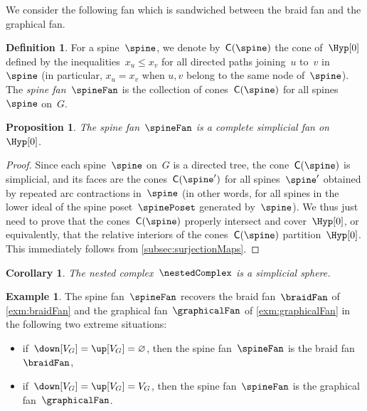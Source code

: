 \documentclass{amsart}
\newtheorem{corollary}[theorem]{Corollary}
\newtheorem{proposition}[theorem]{Proposition}
\theoremstyle{definition}
\newtheorem{definition}[theorem]{Definition}
\newtheorem{example}[theorem]{Example}
\renewcommand{\b}[1]{{\boldsymbol{#1}}} %
\newcommand{\set}[2]{\left\{ #1 \;\middle|\; #2 \right\}} %
\newcommand{\eqdef}{\mbox{\,\raisebox{0.2ex}{\scriptsize\ensuremath{\mathrm:}}\ensuremath{=}\,}} %
\newcommand{\darkblue}{\color{darkblue}} %
\newcommand{\defn}[1]{\textsl{\darkblue #1}} %
\newcommand{\vincent}[1]{\todo[color=blue!30]{#1 \\ \hfill --- V.}}
\newcommand{\normalCone}{\mathsf{C}} %
\begin{document}
We consider the following fan which is sandwiched between the braid fan and the graphical fan.

\begin{definition}
  \label{def:spineFan}
  For a spine~$\spine$, we denote by~$\normalCone(\spine)$ the cone of~$\Hyp[0]$ defined by the inequalities~$x_u \le x_v$ for all directed paths joining~$u$ to~$v$ in~$\spine$ (in particular, $x_u = x_v$ when $u,v$ belong to the same node of~$\spine$).
  The \defn{spine fan}~$\spineFan$ is the collection of cones~$\normalCone(\spine)$ for all spines~$\spine$ on~$G$.  
\end{definition}

\begin{proposition}
  \label{prop:spineFan}
  The spine fan~$\spineFan$ is a complete simplicial fan on~$\Hyp[0]$.
\end{proposition}

\begin{proof}
  Since each spine~$\spine$ on~$G$ is a directed tree, the cone~$\normalCone(\spine)$ is simplicial, and its faces are the cones~$\normalCone(\spine')$ for all spines~$\spine'$ obtained by repeated arc contractions in~$\spine$ (in other words, for all spines in the lower ideal of the spine poset~$\spinePoset$ generated by~$\spine$).
  We thus just need to prove that the cones~$\normalCone(\spine)$ properly intersect and cover~$\Hyp[0]$, or equivalently, that the relative interiors of the cones~$\normalCone(\spine)$ partition~$\Hyp[0]$.
  This immediately follows from \cref{subsec:surjectionMaps}.
  \vincent{Be more precise here.}
\end{proof}

\begin{corollary} 
   The nested complex~$\nestedComplex$ is a simplicial sphere.
\end{corollary}

%

\begin{example}
  \label{exm:braidFanGraphicalFan}
  The spine fan~$\spineFan$ recovers the braid fan~$\braidFan$ of \cref{exm:braidFan} and the graphical fan~$\graphicalFan$ of \cref{exm:graphicalFan} in the following two extreme situations:
  \begin{itemize}
    \item if~$\down[V_G] = \up[V_G] = \varnothing$, then the spine fan~$\spineFan$ is the braid fan~$\braidFan$,
    \item if~$\down[V_G] = \up[V_G] = V_G$, then the spine fan~$\spineFan$ is the graphical fan~$\graphicalFan$.
  \end{itemize}
\end{example}
\end{document}
